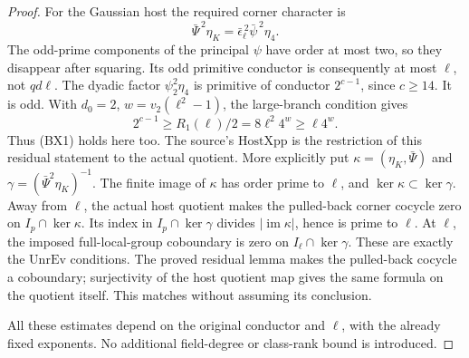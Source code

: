\begin{proof}
For the Gaussian host the required corner character is
\[
                    \bar\Psi^{\,2}\eta_K
                         =\bar\epsilon_\ell^{\,2}\bar\psi^{\,2}\eta_4.
\]
The odd-prime components of the principal \(\psi\)
have order at most two, so they disappear after squaring.
Its odd primitive conductor is consequently at most
\(\ell\), not \(qd\ell\).
The dyadic factor \(\psi_2^2\eta_4\) is primitive of
conductor \(2^{c-1}\), since \(c\ge14\).
It is odd.
With \(d_0=2\), \(w=v_2(\ell^2-1)\), the large-branch
condition gives
\[
        2^{c-1}\ge R_1(\ell)/2
                  =8\ell^2 4^w\ge\ell4^w .
\]
Thus (BX1) holds here too.
The source's \(\mathrm{HostXpp}\) is the restriction
of this residual statement to the actual quotient.
More explicitly put
\(\kappa=(\eta_K,\bar\Psi)\) and
\(\gamma=(\bar\Psi^2\eta_K)^{-1}\).
The finite image of \(\kappa\) has order prime to
\(\ell\), and \(\ker\kappa\subset\ker\gamma\).
Away from \(\ell\), the actual host quotient makes
the pulled-back corner cocycle zero on
\(I_p\cap\ker\kappa\).
Its index in \(I_p\cap\ker\gamma\) divides
\(|\operatorname{im}\kappa|\), hence is prime to
\(\ell\).
At \(\ell\), the imposed full-local-group
coboundary is zero on \(I_\ell\cap\ker\gamma\).
These are exactly the \(\mathrm{UnrEv}\) conditions.
The proved residual lemma makes the pulled-back cocycle
a coboundary; surjectivity of the host quotient map
gives the same formula on the quotient itself.
This matches 
without assuming its conclusion.

All these estimates depend on the original conductor
and \(\ell\), with the already fixed exponents.
No additional field-degree or class-rank bound is introduced.
\end{proof}

